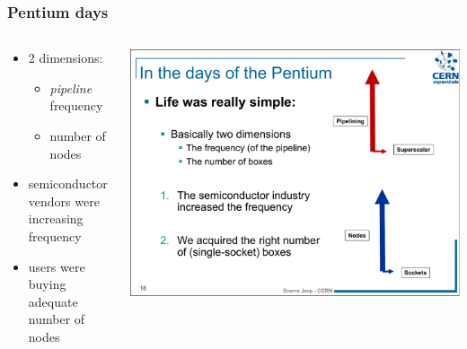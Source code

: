\documentclass[9pt]{beamer}
\begin{document}


\begin{frame}
\frametitle{Pentium days}
\begin{columns}
  \begin{column}{0.5\textwidth}

    \begin{itemize}
    \item \alert{2} dimensions:
      \begin{itemize}
      \item \emph{pipeline} frequency
      \item number of nodes
      \end{itemize}
    \item semiconductor vendors were \alert{increasing frequency}
    \item users were buying adequate number of nodes
    \end{itemize}
  \end{column}
  \begin{column}{0.5\textwidth}
    
    \begin{center}
      \includegraphics[width=.6\textwidth]{figs/sverre-pentium.pdf}
    \end{center}
  \end{column}
\end{columns}
\end{frame}
\end{document}
